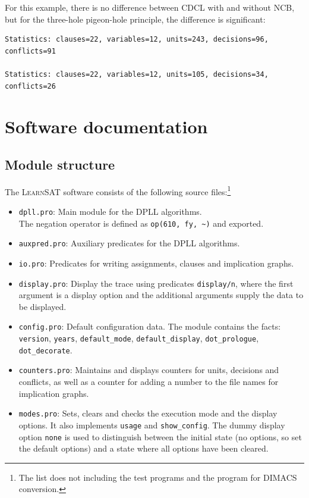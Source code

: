 \documentclass[11pt]{report}
\newcommand*{\p}[1]{\textup{\texttt{#1}}}
\newcommand*{\ls}{\textsc{LearnSAT}}
\begin{document}
For this example, there is no difference between CDCL with and without
NCB, but for the three-hole pigeon-hole principle, the difference is
significant:
\begin{verbatim}
Statistics: clauses=22, variables=12, units=243, decisions=96, conflicts=91

Statistics: clauses=22, variables=12, units=105, decisions=34, conflicts=26
\end{verbatim}


\chapter{Software documentation}

\section{Module structure}

The \ls{} software consists of the following source files:\footnote{The
list does not including the test programs and the program for DIMACS
conversion.}

\begin{itemize}
\item \p{dpll.pro}: Main module for the DPLL algorithms.\\
The negation operator is defined as \verb+op(610, fy, ~)+ and exported.

\item \p{auxpred.pro}: Auxiliary predicates for the DPLL algorithms. 

\item \p{io.pro}: Predicates for writing assignments, clauses and
implication graphs.

\item \p{display.pro}: Display the trace using predicates \p{display/n},
where the first argument is a display option and the additional
arguments supply the data to be displayed.

\item \p{config.pro}: Default configuration data. The module contains
the facts: \p{version}, \p{years}, \p{default\_mode},
\p{default\_display}, \p{dot\_prologue}, \p{dot\_decorate}.

\item \p{counters.pro}: Maintains and displays counters for units,
decisions and conflicts, as well as a counter for adding a number to the
file names for implication graphs.

\item \p{modes.pro}: Sets, clears and checks the execution mode and the
display options. It also implements \p{usage} and \p{show\_config}. The
dummy display option \p{none} is used to distinguish between the initial
state (no options, so set the default options) and a state where all
options have been cleared.

\end{itemize}
\end{document}
